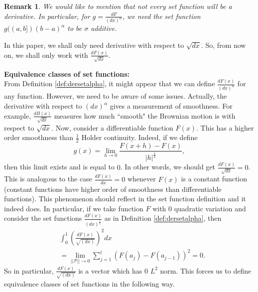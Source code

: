 \documentclass[reqno,12pt]{amsart}
\theoremstyle{plain}
\newtheorem{remark}{Remark}
\theoremstyle{definition}
\begin{document}

\begin{remark} 
We would like to mention that not every set function will be a derivative. In particular, for $g= \frac{dF}{(dx)^{\alpha}}$, we need the set function $g((a,b])(b-a)^{\alpha}$ to be $\sigma$ additive.
\end{remark}

\noindent 
In this paper, we shall only need derivative with respect to $\sqrt{dx}$. So, from now on, we shall only work with $\frac{dF(x)}{\sqrt{dx}}$. 

\noindent 
\textbf{Equivalence classes of set functions:}\\
From Definition \ref{def:dersetalpha}, it might appear that we can define $\frac{dF(x)}{(dx)^{\alpha}}$ for any function. However, we need to be aware of some issues. Actually, the derivative with respect to $(dx)^{\alpha}$ gives a measurement of smoothness. For example, $\frac{dB(x)}{\sqrt{dx}}$ measures how much ``smooth" the Brownian motion is with respect to $\sqrt{dx}$. Now, consider a differentiable function $F(x)$. This has a higher order smoothness than $\frac{1}{2}$ Holder continuity. Indeed, if we define 
\[
g(x)= \lim_{h \to 0}\frac{F(x+h)- F(x)}{|h|^{\frac{1}{2}}},
\]
then this limit exists and is equal to $0$. In other words, we should get $\frac{dF(x)}{\sqrt{dx}}=0$. This is analogous to the case $\frac{dF(x)}{dx}=0$ whenever $F(x)$ is a constant function (constant functions have higher order of smoothness than differentiable functions). This phenomenon should reflect in the set function definition and it indeed does. In particular, if we take function $F$ with $0$ quadratic variation and consider the set functions $\frac{dF(x)}{(dx)^{\frac{1}{2}}}$ as in Definition \ref{def:dersetalpha}, then 
\begin{equation}
    \begin{split}
        &\int_{0}^{1} \left(\frac{dF(x)}{\sqrt{(dx)}}\right)^2 dx \\
        &= \lim_{||\mathcal{P}||\to 0} \sum_{j=1}^{l} \left( F(a_{j}) - F(a_{j-1})\right)^2 =0.
    \end{split}
\end{equation}
So in particular, $\frac{dF(x)}{\sqrt{(dx)}}$ is a vector which has $0$ $L^{2}$ norm. This forces us to define equivalence classes of set functions in the following way.
\end{document}
